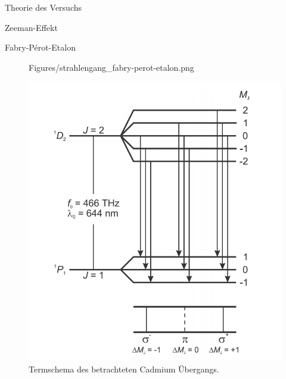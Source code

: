 \documentclass[pdftex, a4paper,11pt, twoside, ngerman]{report}
\begin{document}
\begin{chapter}{Theorie des Versuchs}
\begin{section}{Zeeman-Effekt}
\begin{subsection}{Fabry-Pérot-Etalon}
\begin{figure}[b!]
\begin{minipage}{0.48\textwidth}
            {Figures/strahlengang_fabry-perot-etalon.png}
            \caption{Strahlengang eines \textit{Fabry-Perot-Etalon}'s.
                \cite{bib:FPE}}
            \label{fig:FPEstrahlengang}
          \end{minipage}\quad
          \begin{minipage}{0.48\textwidth}
            \centering
            \includegraphics[width=\textwidth]
                {Figures/termschema.png}
                \caption{Termschema des betrachteten Cadmium Übergangs.
                    \cite{bib:Anleitung}}
            \label{fig:termschema}
          \end{minipage}
        \end{figure}
      \end{subsection}
      
      
      

\end{section}
\end{chapter}
\end{document}
